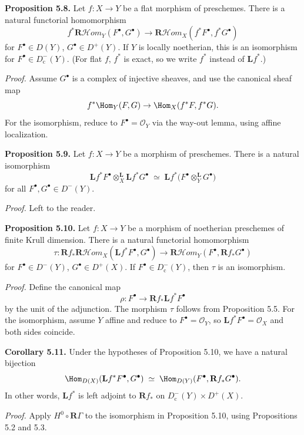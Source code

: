 \textbf{Proposition 5.8.}
Let $f\colon X\to Y$ be a flat morphism of preschemes. There is a natural functorial homomorphism
\[
f^*\mathbf{R}\mathcal{H}\textit{om}_Y(F^\bullet,G^\bullet)
\to
\mathbf{R}\mathcal{H}\textit{om}_X(f^*F^\bullet,f^*G^\bullet)
\]
for $F^\bullet\in D(Y)$, $G^\bullet\in D^+(Y)$.
If $Y$ is locally noetherian, this is an isomorphism for $F^\bullet\in D_{\mathrm{c}}^-(Y)$.
(For flat $f$, $f^*$ is exact, so we write $f^*$ instead of $\mathbf{L}f^*$.)

\textit{Proof.}
Assume $G^\bullet$ is a complex of injective sheaves, and use the canonical sheaf map
\[
f^*\Hom_Y(F,G) \to \Hom_X(f^*F,f^*G).
\]
For the isomorphism, reduce to $F^\bullet=\mathcal{O}_Y$ via the way-out lemma, using affine localization.

\setcounter{page}{110}
\textbf{Proposition 5.9.}
Let $f\colon X\to Y$ be a morphism of preschemes. There is a natural isomorphism
\[
\mathbf{L}f^*F^\bullet\otimes^{\mathbf{L}}_X \mathbf{L}f^*G^\bullet
\;\simeq\;
\mathbf{L}f^*\big(F^\bullet\otimes^{\mathbf{L}}_Y G^\bullet\big)
\]
for all $F^\bullet,G^\bullet\in D^-(Y)$.

\textit{Proof.} Left to the reader.

\textbf{Proposition 5.10.}
Let $f\colon X\to Y$ be a morphism of noetherian preschemes of finite Krull dimension. There is a natural functorial homomorphism
\[
\tau\colon
\mathbf{R}f_*\mathbf{R}\mathcal{H}\textit{om}_X(\mathbf{L}f^*F^\bullet,G^\bullet)
\to
\mathbf{R}\mathcal{H}\textit{om}_Y(F^\bullet,\mathbf{R}f_*G^\bullet)
\]
for $F^\bullet\in D^-(Y)$, $G^\bullet\in D^+(X)$.
If $F^\bullet\in D_{\mathrm{c}}^-(Y)$, then $\tau$ is an isomorphism.

\textit{Proof.}
Define the canonical map
\[
\rho\colon F^\bullet \to \mathbf{R}f_*\mathbf{L}f^*F^\bullet
\]
by the unit of the adjunction. The morphism $\tau$ follows from Proposition 5.5.
For the isomorphism, assume $Y$ affine and reduce to $F^\bullet=\mathcal{O}_Y$, so $\mathbf{L}f^*F^\bullet=\mathcal{O}_X$ and both sides coincide.

\setcounter{page}{111}
\textbf{Corollary 5.11.}
Under the hypotheses of Proposition 5.10, we have a natural bijection
\[
\Hom_{D(X)}(\mathbf{L}f^*F^\bullet,G^\bullet)
\;\simeq\;
\Hom_{D(Y)}(F^\bullet,\mathbf{R}f_*G^\bullet).
\]
In other words, $\mathbf{L}f^*$ is left adjoint to $\mathbf{R}f_*$ on $D_{\mathrm{c}}^-(Y)\times D^+(X)$.

\textit{Proof.}
Apply $H^0\circ\mathbf{R}\Gamma$ to the isomorphism in Proposition 5.10, using Propositions 5.2 and 5.3.

